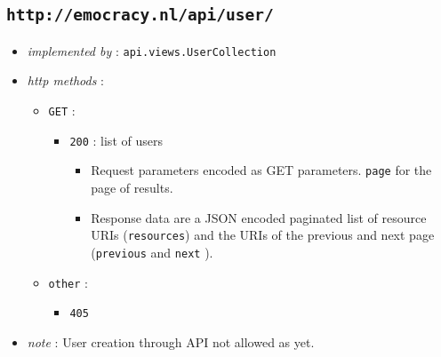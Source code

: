 \documentclass[a4paper]{report}
\begin{document}
\subsection{\texttt{http://emocracy.nl/api/user/}}
\begin{itemize}
    \item{\textsl{implemented by} : \texttt{api.views.UserCollection}}
    \item{\textsl{http methods} :
        \begin{itemize}
            \item{\texttt{GET} :
                \begin{itemize}
                    \item{\texttt{200} : list of users
                    \begin{itemize}
                        \item{Request parameters encoded as GET parameters. 
                        \texttt{page} for the page of results.}
                        \item{Response data are a JSON encoded paginated list of 
                        resource URIs (\texttt{resources}) and the URIs of the 
                        previous and next page (\texttt{previous} and \texttt{next}
                        ).}
                    \end{itemize}
                    }
                \end{itemize}
            }
            \item{\texttt{other} :
                \begin{itemize}
                    \item{\texttt{405}}
                \end{itemize}
            }
        \end{itemize}
    }
    \item{\textsl{note} : User creation through API not allowed as yet.}
\end{itemize}
\end{document}
